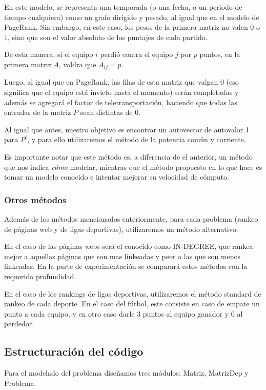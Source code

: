 En este modelo, se representa una temporada (o una fecha, o un periodo de tiempo cualquiera) como un grafo dirigido y pesado, al igual que en el modelo de PageRank. Sin embargo, en este caso, los pesos de la primera matriz no valen 0 o 1, sino que son el valor absoluto de los puntajes de cada partido.

De esta manera, si el equipo $i$ perdió contra el equipo $j$ por $p$ puntos, en la primera matriz $A$, valdra que $A_{ij} = p$. 

Luego, al igual que en PageRank, las filas de esta matriz que valgan 0 (eso significa que el equipo está invicto hasta el momento) serán completadas y además se agregará el factor de teletransportación, haciendo que todas las entradas de la matriz $P$ sean distintas de 0.

Al igual que antes, nuestro objetivo es encontrar un autovector de autovalor 1 para $P^t$, y para ello utilizaremos el método de la potencia común y corriente.

Es importante notar que este m\'etodo es, a diferencia de el anterior, un m\'etodo que nos indica \emph{cómo} modelar, mientras que el m\'etodo propuesto en \cite{Kamvar2003} lo que hace es tomar un modelo conocido e intentar mejorar su velocidad de cómputo.

\subsubsection{Otros m\'etodos}

Además de los m\'etodos mencionados enteriormente, para cada problema (rankeo de páginas web y de ligas deportivas), utilizaremos un m\'etodo alternativo. 

En el caso de las páginas webs será el conocido como IN-DEGREE, que rankea mejor a aquellas páginas que son mas linkeadas y peor a las que son menos linkeadas. En la parte de experimentación se comparará estos m\'etodos con la requerida profundidad.

En el caso de los rankings de ligas deportivas, utilizaremos el m\'etodo standard de rankeo de cada deporte. En el caso del fútbol, este consiste en caso de empate un punto a cada equipo, y en otro caso darle 3 puntos al equipo ganador y 0 al perdedor.


\subsection{Estructuración del código}
Para el modelado del problema diseñamos tres módulos: Matriz, MatrizDep y Problema. 


